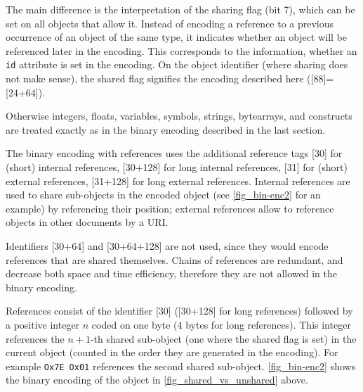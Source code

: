     
  The main difference is the interpretation of the sharing flag (bit 7), which can be set
  on all objects that allow it. Instead of encoding a reference to a previous occurrence
  of an object of the same type, it indicates whether an object will be referenced later
  in the encoding. This corresponds to the information, whether an \lstinline|id|
  attribute is set in the \XML encoding. On the object identifier (where sharing does not
  make sense), the shared flag signifies the encoding described here ([88]=[24+64]).
        
  Otherwise integers, floats, variables, symbols, strings, bytearrays, and constructs are
  treated exactly as in the binary encoding described in the last section.

    
  The binary encoding with references uses the additional reference tags [30] for (short)
  internal references, [30+128] for long internal references, [31] for (short) external
  references, [31+128] for long external references. Internal references are used to share
  sub-objects in the encoded object (see \ref{fig_bin-enc2} for an example) by referencing
  their position; external references allow to reference \OM objects in other documents by
  a URI.

  Identifiers [30+64] and [30+64+128] are not used, since they would encode references
  that are shared themselves. Chains of references are redundant, and decrease both space
  and time efficiency, therefore they are not allowed in the \OM binary encoding.

    
  References consist of the identifier [30] ([30+128] for long references) followed by a
  positive integer $n$ coded on one byte (4 bytes for long references). This integer
  references the $n+1$-th shared sub-object (one where the shared flag is set) in the
  current object (counted in the order they are generated in the encoding). For example
  \lstinline|Ox7E Ox01| references the second shared sub-object. \ref{fig_bin-enc2} shows
  the binary encoding of the object in \ref{fig_shared_vs_unshared} above.

